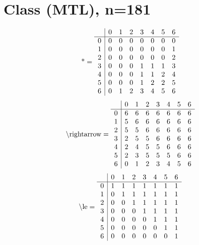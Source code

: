 \documentclass[11pt]{article}
\begin{document}
\section{Class (MTL), n=181}
\[\text{*} = 
\begin{array}{r | r r r r r r r}
 & 0 & 1 & 2 & 3 & 4 & 5 & 6 \\ \hline
0 & 0 & 0 & 0 & 0 & 0 & 0 & 0 \\
1 & 0 & 0 & 0 & 0 & 0 & 0 & 1 \\
2 & 0 & 0 & 0 & 0 & 0 & 0 & 2 \\
3 & 0 & 0 & 0 & 1 & 1 & 1 & 3 \\
4 & 0 & 0 & 0 & 1 & 1 & 2 & 4 \\
5 & 0 & 0 & 0 & 1 & 2 & 2 & 5 \\
6 & 0 & 1 & 2 & 3 & 4 & 5 & 6 \\
\end{array}
\]
\[\text{\textbackslash rightarrow} = 
\begin{array}{r | r r r r r r r}
 & 0 & 1 & 2 & 3 & 4 & 5 & 6 \\ \hline
0 & 6 & 6 & 6 & 6 & 6 & 6 & 6 \\
1 & 5 & 6 & 6 & 6 & 6 & 6 & 6 \\
2 & 5 & 5 & 6 & 6 & 6 & 6 & 6 \\
3 & 2 & 5 & 5 & 6 & 6 & 6 & 6 \\
4 & 2 & 4 & 5 & 5 & 6 & 6 & 6 \\
5 & 2 & 3 & 5 & 5 & 5 & 6 & 6 \\
6 & 0 & 1 & 2 & 3 & 4 & 5 & 6 \\
\end{array}
\]
\[\text{\textbackslash le} = 
\begin{array}{r | r r r r r r r}
 & 0 & 1 & 2 & 3 & 4 & 5 & 6 \\ \hline
0 & 1 & 1 & 1 & 1 & 1 & 1 & 1 \\
1 & 0 & 1 & 1 & 1 & 1 & 1 & 1 \\
2 & 0 & 0 & 1 & 1 & 1 & 1 & 1 \\
3 & 0 & 0 & 0 & 1 & 1 & 1 & 1 \\
4 & 0 & 0 & 0 & 0 & 1 & 1 & 1 \\
5 & 0 & 0 & 0 & 0 & 0 & 1 & 1 \\
6 & 0 & 0 & 0 & 0 & 0 & 0 & 1 \\
\end{array}
\]
\end{document}
